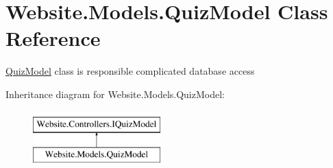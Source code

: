 \hypertarget{class_website_1_1_models_1_1_quiz_model}{}\section{Website.\+Models.\+Quiz\+Model Class Reference}
\label{class_website_1_1_models_1_1_quiz_model}


\hyperlink{class_website_1_1_models_1_1_quiz_model}{Quiz\+Model} class is responsible complicated database access  


Inheritance diagram for Website.\+Models.\+Quiz\+Model\+:\begin{figure}[H]
\begin{center}
\leavevmode
\includegraphics[height=2.000000cm]{class_website_1_1_models_1_1_quiz_model}
\end{center}
\end{figure}
